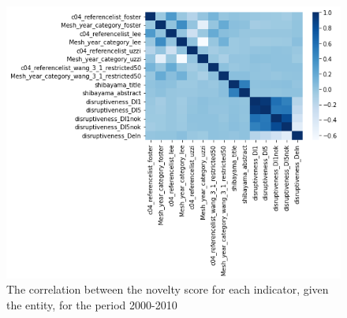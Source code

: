 \begin{figure}[H]
  \centering
  \includegraphics[width=0.63\linewidth]{3_chapter3/figures/heatmap.png}
\caption[Novelty indicators correlation]{\justifying The correlation between the novelty score for each indicator, given the entity, for the period 2000-2010}
\label{fig:13}
\end{figure}
